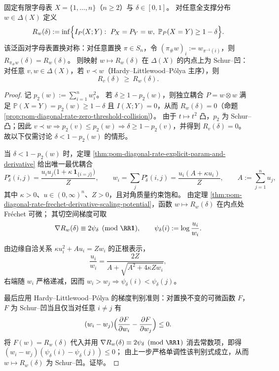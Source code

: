 \begin{theorem}\label{thm:pom-diagonal-rate-schur-concavity}
固定有限字母表 \(X=\{1,\dots,n\}\)（\(n\ge 2\)）与 \(\delta\in[0,1]\)。
对任意全支撑分布 \(w\in\Delta(X)\) 定义
\[
R_w(\delta):=\inf\Bigl\{I_P(X;Y):\ P_X=P_Y=w,\ \mathbb P_P(X=Y)\ge 1-\delta\Bigr\}.
\]
该泛函对字母表置换对称：对任意置换 \(\pi\in S_n\)，令 \((\pi_\#w)_i:=w_{\pi^{-1}(i)}\)，则 \(R_{\pi_\#w}(\delta)=R_w(\delta)\)。
则映射 \(w\mapsto R_w(\delta)\) 在 \(\Delta(X)\) 的内点上为 Schur--凹：
对任意 \(v,w\in\Delta(X)\)，若 \(v\prec w\)（Hardy--Littlewood--P\'olya 主序），则
\[
R_v(\delta)\ \ge\ R_w(\delta).
\]
\end{theorem}
\begin{proof}
记 \(p_2(w):=\sum_{i=1}^n w_i^2\)。
若 \(\delta\ge 1-p_2(w)\)，则独立耦合 \(P=w\otimes w\) 满足
\(
\mathbb P(X=Y)=p_2(w)\ge 1-\delta
\)
且 \(I(X;Y)=0\)，从而 \(R_w(\delta)=0\)（命题 \ref{prop:pom-diagonal-rate-zero-threshold-collision}）。
由于 \(t\mapsto t^2\) 凸，\(p_2\) 为 Schur--凸；因此 \(v\prec w\Rightarrow p_2(v)\le p_2(w)\Rightarrow \delta\ge 1-p_2(v)\)，并得到 \(R_v(\delta)=0\)。
故以下仅需讨论 \(\delta<1-p_2(w)\) 的情形。
\par
当 \(\delta<1-p_2(w)\) 时，定理 \ref{thm:pom-diagonal-rate-explicit-param-and-derivative} 给出唯一最优耦合
\[
P^\star_\delta(i,j)=\frac{u_i u_j\bigl(1+\kappa\,\mathbf 1_{\{i=j\}}\bigr)}{Z},
\qquad
w_i=\sum_j P^\star_\delta(i,j)=\frac{u_i(A+\kappa u_i)}{Z},
\qquad
A:=\sum_{j=1}^n u_j,
\]
其中 \(\kappa>0\)、\(u\in(0,\infty)^n\)、\(Z>0\)，且对角质量约束饱和。
由定理 \ref{thm:pom-diagonal-rate-frechet-derivative-scaling-potential}，函数 \(w\mapsto R_w(\delta)\) 在内点处 Fr\'echet 可微；
其切空间梯度可取
\[
\nabla R_w(\delta)\equiv 2\psi_\delta \pmod{\RR\mathbf 1},
\qquad
\psi_\delta(i):=\log\frac{u_i}{w_i}.
\]
\par
由边缘自洽关系 \(\kappa u_i^2+A u_i=Zw_i\) 的正根表示，
\[
\frac{u_i}{w_i}
=\frac{2Z}{A+\sqrt{A^2+4\kappa Zw_i}},
\]
右端随 \(w_i\) 严格递减，因而 \(w_i>w_j\Rightarrow \psi_\delta(i)<\psi_\delta(j)\)。
\par
最后应用 Hardy--Littlewood--P\'olya 的梯度判别准则：对置换不变的可微函数 \(F\)，\(F\) 为 Schur--凹当且仅当对任意 \(i\ne j\) 有
\[
(w_i-w_j)\Bigl(\frac{\partial F}{\partial w_i}-\frac{\partial F}{\partial w_j}\Bigr)\le 0.
\]
将 \(F(w)=R_w(\delta)\) 代入并用 \(\nabla R_w(\delta)\equiv 2\psi_\delta\pmod{\RR\mathbf 1}\) 消去常数项，即得
\(
(w_i-w_j)(\psi_\delta(i)-\psi_\delta(j))\le 0
\)；
由上一步严格单调性该判别式成立，从而 \(w\mapsto R_w(\delta)\) 为 Schur--凹。证毕。
\end{proof}

